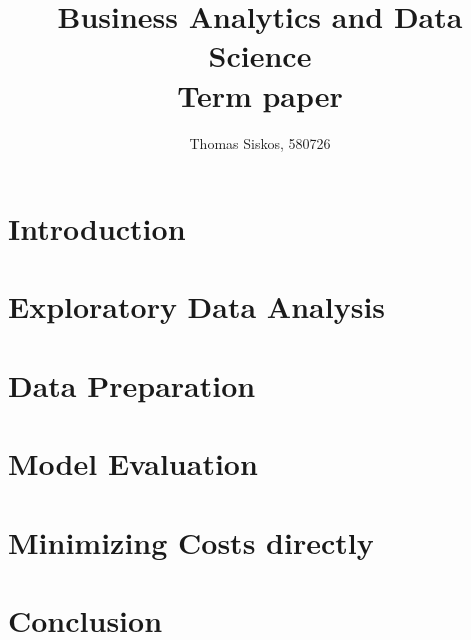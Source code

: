 \documentclass{article}
\begin{document}
\title{Business Analytics and Data Science \\
       \large Term paper}
\author{Thomas Siskos, 580726}

\maketitle

\section{Introduction}
\label{introduction}


\section{Exploratory Data Analysis}
\label{eda}


\section{Data Preparation}
\label{preparation}


\section{    }
\label{tuning}



\section{Model Evaluation}
\label{evaluation}


\section{Minimizing Costs directly}
\label{special}


\section{Conclusion}
\label{conclusion}


\newpage


\end{document}
